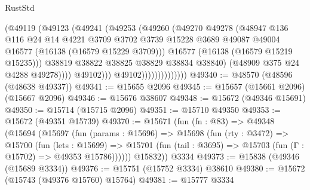 \begin{lexlean}{RustStd}
\begin{coremodule}
                                    (@49119
                                      (@49123
                                        (@49241
                                          (@49253
                                            (@49260
                                              (@49270
                                                @49278
                                                (@48947
                                                  @136
                                                  @116
                                                  @24
                                                  @14
                                                  @4221
                                                  @3709
                                                  @3702
                                                  @3739
                                                  @15228
                                                  @3689
                                                  @49087
                                                  @49004
                                                  @16577
                                                  (@16138 (@16579 @15229 @3709)))
                                                @16577
                                                (@16138 (@16579 @15219 @15235)))
                                              @38819
                                              @38822
                                              @38825
                                              @38829
                                              @38834
                                              @38840)
                                            (@48909 @375 @24 @4288 @49278))))
                                      @49102)))
                                @49102))))))))))))))
@49340 := @48570 (@48596 (@48638 @49337))
@49341 := @15655 @2096
@49345 := @15657 (@15661 @2096) (@15667 @2096)
@49346 := @15676 @38607
@49348 := @15672 (@49346 @15691)
@49350 := @15714 (@15715 @2096)
@49351 := @15710 @49350
@49353 := @15672 (@49351 @15739)
@49370 := @15671
    (fun (fn : @83) =>
    @49348
      (@15694
        (@15697
          (fun (params : @15696) =>
          @15698
            (fun (rty : @3472) =>
            @15700
              (fun (lets : @15699) =>
              @15701 (fun (tail : @3695) => @15703 (fun (Γ : @15702) => @49353 @15786))))))
        @15832))
    @3334
@49373 := @15838 (@49346 (@15689 @3334))
@49376 := @15751 (@15752 @3334) @38610
@49380 := @15672 (@15743 (@49376 @15760) @15764)
@49381 := @15777 @3334

\end{coremodule}
\end{lexlean}
